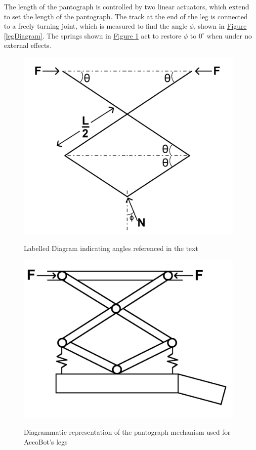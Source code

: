 \documentclass[11pt]{article}		%
\newlength{\imageheight}	 %
\newcommand{\figref}[1]{\hyperref[#1]{Figure \ref*{#1}}}    %
\begin{document}
				The length of the pantograph is controlled by two linear actuators, which extend to set the length of the pantograph.
				The track at the end of the leg is connected to a freely turning joint, which is measured to find the angle $\phi$, shown in \figref{legDiagram}.
				The springs shown in \figref{legDesign} act to restore $\phi$ to $0^\circ$ when under no external effects.
				\begin{figure}[h]
    				\centering
    				\begin{multicols}{2}
    					\includegraphics[height=\imageheight]{legDiagram}
    					\caption{Labelled Diagram indicating angles referenced in the text}
    					\label{legDiagram}
    					\columnbreak
    					\includegraphics[height=\imageheight]{legDesign}
    					\caption{Diagrammatic representation of the pantograph mechanism used for AccoBot's legs}
    					\label{legDesign}
    				\end{multicols}
    			\end{figure}
\end{document}
